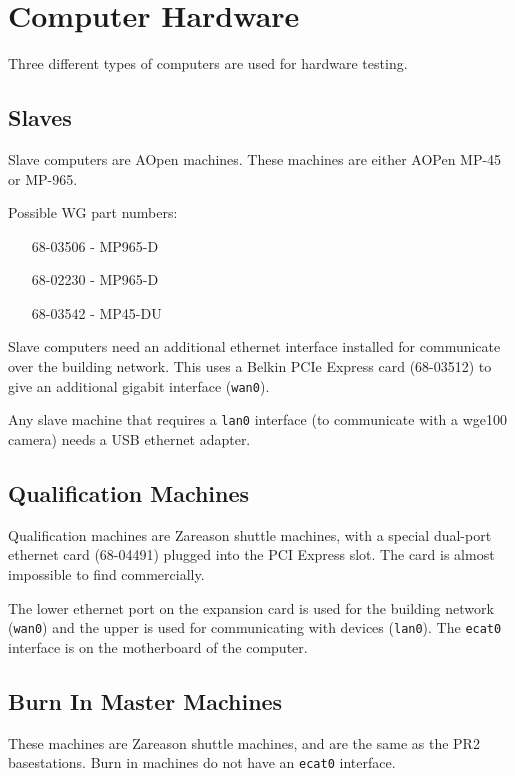 \documentclass[11pt]{book}
\begin{document}
\section{Computer Hardware}

Three different types of computers are used for hardware testing.

\subsection{Slaves}

Slave computers are AOpen machines. These machines are either AOPen MP-45 or MP-965. 

Possible WG part numbers:
\begin{itemize}
\item [68-03506] - MP965-D
\item [68-02230] - MP965-D
\item [68-03542] - MP45-DU
\end{itemize}

Slave computers need an additional ethernet interface installed for communicate over the building network. This uses a Belkin PCIe Express card (68-03512) to give an additional gigabit interface (\texttt{wan0}).

Any slave machine that requires a \texttt{lan0} interface (to communicate with a wge100 camera) needs a USB ethernet adapter. 

\subsection{Qualification Machines}

Qualification machines are Zareason shuttle machines, with a special dual-port ethernet card (68-04491) plugged into the PCI Express slot. The card is almost impossible to find commercially.

The lower ethernet port on the expansion card is used for the building network (\texttt{wan0}) and the upper is used for communicating with devices (\texttt{lan0}). The \texttt{ecat0} interface is on the motherboard of the computer.

\subsection{Burn In Master Machines}

These machines are Zareason shuttle machines, and are the same as the PR2 basestations. Burn in machines do not have an \texttt{ecat0} interface.
\end{document}
